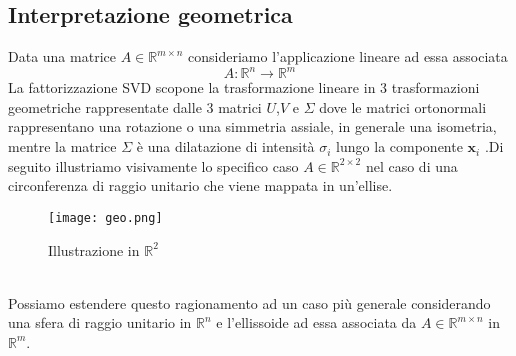 \documentclass[11pt]{article}
\newcommand{\R}{\mathbb{R}} %
\begin{document}
\subsection{Interpretazione geometrica}
Data una matrice $A \in \R^{m \times n}$ consideriamo l'applicazione lineare ad essa associata $$A: \R^n \rightarrow \R^m$$
La fattorizzazione SVD scopone la trasformazione lineare in 3 trasformazioni geometriche rappresentate dalle 3 matrici $U$,$V$ e $\Sigma$ dove le matrici ortonormali rappresentano una rotazione o una simmetria assiale, in generale una isometria, mentre la matrice $\Sigma$ è una dilatazione di intensità $\sigma_i$ lungo la componente $\mathbf{x}_i$ .Di seguito illustriamo visivamente lo specifico caso $A \in \R^{2 \times 2}$ nel caso di una circonferenza di raggio unitario che viene mappata in un'ellise.
\begin{figure}[h]
    \centering
    \texttt{[image: geo.png]}
    \caption{Illustrazione in $\R^2$}
    \label{fig:geo}
\end{figure}
\noindent \\
Possiamo estendere questo ragionamento ad un caso più generale considerando una sfera di raggio unitario in $\R^n$ e l'ellissoide ad essa associata da $A \in \R^{m \times n}$ in $\R^m$.\\
\end{document}
